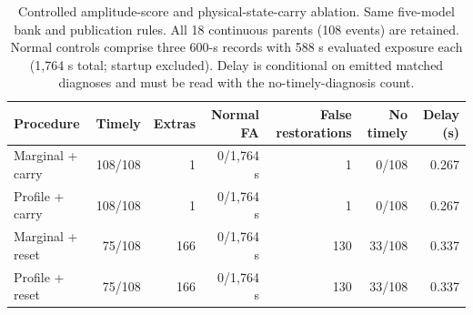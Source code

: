 \begin{table}[t]\centering\scriptsize
\caption{Controlled amplitude-score and physical-state-carry ablation. Same five-model bank and publication rules. All 18 continuous parents (108 events) are retained. Normal controls comprise three 600-s records with 588 s evaluated exposure each (1,764 s total; startup excluded). Delay is conditional on emitted matched diagnoses and must be read with the no-timely-diagnosis count.}
\label{tab:a01}
\begin{tabular}{lrrrrrr}\toprule
Procedure & Timely & Extras & Normal FA & False restorations & No timely & Delay (s)\\\midrule
Marginal + carry & 108/108 & 1 & 0/1,764 s & 1 & 0/108 & 0.267\\
Profile + carry & 108/108 & 1 & 0/1,764 s & 1 & 0/108 & 0.267\\
Marginal + reset & 75/108 & 166 & 0/1,764 s & 130 & 33/108 & 0.337\\
Profile + reset & 75/108 & 166 & 0/1,764 s & 130 & 33/108 & 0.337\\
\bottomrule\end{tabular}\end{table}
